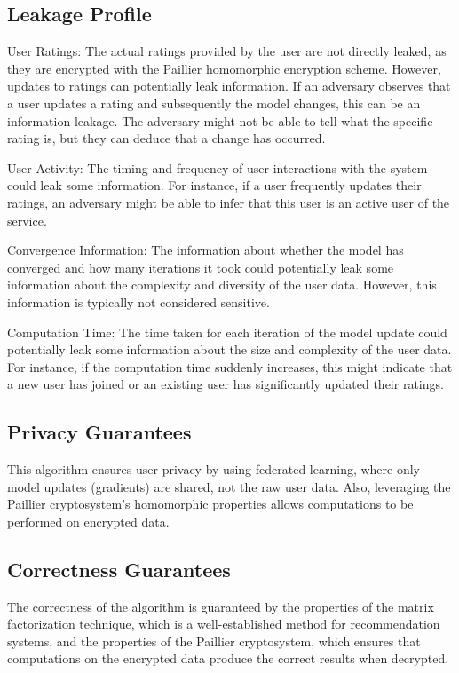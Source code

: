 \documentclass{article}
\begin{document}
\subsection{Leakage Profile}
User Ratings: The actual ratings provided by the user are not directly leaked, as they are encrypted with the Paillier homomorphic encryption scheme. However, updates to ratings can potentially leak information. If an adversary observes that a user updates a rating and subsequently the model changes, this can be an information leakage. The adversary might not be able to tell what the specific rating is, but they can deduce that a change has occurred.

User Activity: The timing and frequency of user interactions with the system could leak some information. For instance, if a user frequently updates their ratings, an adversary might be able to infer that this user is an active user of the service.

Convergence Information: The information about whether the model has converged and how many iterations it took could potentially leak some information about the complexity and diversity of the user data. However, this information is typically not considered sensitive.

Computation Time: The time taken for each iteration of the model update could potentially leak some information about the size and complexity of the user data. For instance, if the computation time suddenly increases, this might indicate that a new user has joined or an existing user has significantly updated their ratings.

\subsection{Privacy Guarantees}
This algorithm ensures user privacy by using federated learning, where only model updates (gradients) are shared, not the raw user data. Also, leveraging the Paillier cryptosystem's homomorphic properties allows computations to be performed on encrypted data.

\subsection{Correctness Guarantees}
The correctness of the algorithm is guaranteed by the properties of the matrix factorization technique, which is a well-established method for recommendation systems, and the properties of the Paillier cryptosystem, which ensures that computations on the encrypted data produce the correct results when decrypted.
\end{document}
